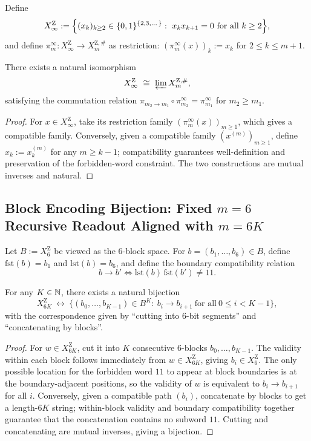 \begin{definition}\label{def:app-XinfZ}
Define
\[
X_\infty^{\mathrm Z}:=\Bigl\{(x_k)_{k\ge 2}\in\{0,1\}^{\{2,3,\dots\}}:\ x_kx_{k+1}=0\ \text{for all}\ k\ge 2\Bigr\},
\]
and define $\pi_m^\infty:X_\infty^{\mathrm Z}\to X_m^{\mathrm Z,\#}$ as restriction: $(\pi_m^\infty(x))_k:=x_k$ for $2\le k\le m+1$.
\end{definition}

\begin{theorem}\label{thm:app-inverse-limit}
There exists a natural isomorphism
\[
X_\infty^{\mathrm Z}\ \cong\ \varprojlim X_m^{\mathrm Z,\#},
\]
satisfying the commutation relation $\pi_{m_2\to m_1}\circ \pi_{m_2}^\infty=\pi_{m_1}^\infty$ for $m_2\ge m_1$.
\end{theorem}

\begin{proof}
For $x\in X_\infty^{\mathrm Z}$, take its restriction family $(\pi_m^\infty(x))_{m\ge 1}$, which gives a compatible family. Conversely, given a compatible family $(x^{(m)})_{m\ge 1}$, define $x_k:=x^{(m)}_k$ for any $m\ge k-1$; compatibility guarantees well-definition and preservation of the forbidden-word constraint. The two constructions are mutual inverses and natural.
\end{proof}

\subsection{Block Encoding Bijection: Fixed $m=6$ Recursive Readout Aligned with $m=6K$}

Let $B:=X_6^{\mathrm Z}$ be viewed as the 6-block space. For $b=(b_1,\dots,b_6)\in B$, define $\mathrm{fst}(b)=b_1$ and $\mathrm{lst}(b)=b_6$, and define the boundary compatibility relation
\[
b\to b'\iff \mathrm{lst}(b)\,\mathrm{fst}(b')\neq 11.
\]

\begin{proposition}\label{prop:app-block-bijection}
For any $K\in\mathbb{N}$, there exists a natural bijection
\[
X_{6K}^{\mathrm Z}\ \longleftrightarrow\ \{(b_0,\dots,b_{K-1})\in B^K:\ b_i\to b_{i+1}\ \text{for all}\ 0\le i<K-1\},
\]
with the correspondence given by ``cutting into 6-bit segments'' and ``concatenating by blocks''.
\end{proposition}

\begin{proof}
For $w\in X_{6K}^{\mathrm Z}$, cut it into $K$ consecutive 6-blocks $b_0,\dots,b_{K-1}$. The validity within each block follows immediately from $w\in X_{6K}^{\mathrm Z}$, giving $b_i\in X_6^{\mathrm Z}$. The only possible location for the forbidden word $11$ to appear at block boundaries is at the boundary-adjacent positions, so the validity of $w$ is equivalent to $b_i\to b_{i+1}$ for all $i$. Conversely, given a compatible path $(b_i)$, concatenate by blocks to get a length-$6K$ string; within-block validity and boundary compatibility together guarantee that the concatenation contains no subword $11$. Cutting and concatenating are mutual inverses, giving a bijection.
\end{proof}
